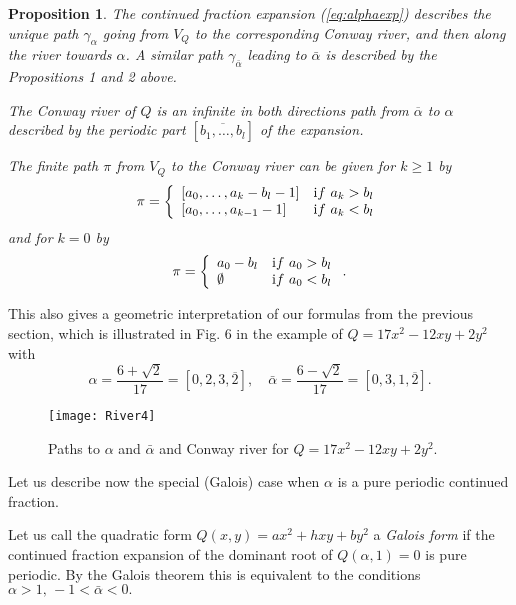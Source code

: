 \documentclass[11pt,reqno]{amsart}
\newtheorem{prop}{Proposition}
\begin{document}
\begin{prop}
The continued fraction expansion (\ref{eq:alphaexp}) describes the unique path $\gamma_\alpha$ going from $V_Q$ to the corresponding Conway river, and then along the river towards $\alpha$. A similar path $\gamma_{\bar\alpha}$ leading to $\bar\alpha$ is described by the Propositions 1 and 2 above.

The Conway river of $Q$ is an infinite in both directions path from $\overline{\alpha}$ to $\alpha$ described by the periodic part $\left[\overline{b_1, \ldots, b_l } \right]$ of the expansion.

The finite path $\pi$ from $V_Q$ to the Conway river can be given for $k\geq 1$ by
\begin{equation*}
\pi = \left\{
  \begin{array}{lr}
    \left[ a_0, \ldots, a_k - b_l -1 \right] & {\text if} \,\, a_k > b_l\\
    \left[ a_0, \ldots, a_{k-1} -1 \right] & {\text if} \,\, a_k < b_l
  \end{array}
\right. 
\end{equation*}
and for $k=0$ by
\begin{equation*}
\pi = \left\{
  \begin{array}{lr}
    a_0 - b_l& {\text if} \,\, a_0 > b_l\\
    \emptyset &{\text if} \,\,  a_0 < b_l
  \end{array}
\right. .
\end{equation*}
\end{prop}

This also gives a geometric interpretation of our formulas from the previous section, which is
 illustrated in Fig. 6 in the example of $Q=17x^2-12xy+2y^2$ with 
$$
\alpha=\frac{6+\sqrt{2}}{17}=[0,2,3,\overline{2}], \quad \bar\alpha=\frac{6-\sqrt{2}}{17}=[0,3,1,\overline{2}].
$$

 \begin{figure}[h]
\begin{center}
\texttt{[image: River4]} 
\caption{\small Paths to $\alpha$ and $\bar\alpha$ and Conway river for $Q=17x^2-12xy+2y^2.$}
\end{center}
\end{figure}

Let us describe now the special (Galois) case when $\alpha$ is a pure periodic continued fraction.

Let us call the quadratic form $Q(x, y) = ax^2 + hxy + by^2$ a {\it Galois form} if the continued fraction expansion of the dominant root of
$Q(\alpha,1)=0$ is pure periodic. By the Galois theorem this is equivalent to the conditions $\alpha>1, \, -1<\bar\alpha<0.$
\end{document}
